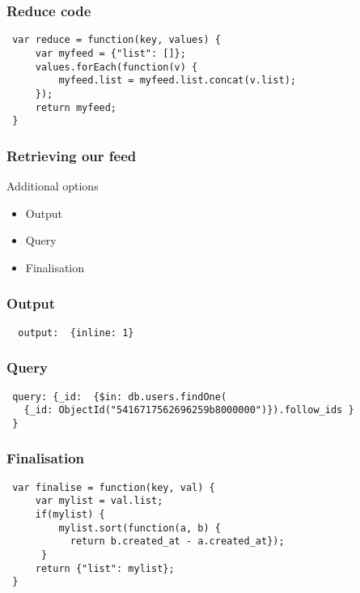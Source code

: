 \documentclass[10pt]{beamer}
\begin{document}
\begin{frame}[fragile]
  \frametitle{Reduce code}

 \begin{verbatim}
 var reduce = function(key, values) {
     var myfeed = {"list": []};
     values.forEach(function(v) {
         myfeed.list = myfeed.list.concat(v.list);
     });
     return myfeed;
 }
	     \end{verbatim}

\end{frame}


\begin{frame}
  \frametitle{Retrieving our feed}

  Additional options
 \begin{itemize}
  \item Output
  \item Query
  \item Finalisation
 \end{itemize}


\end{frame}
\begin{frame}[fragile]

  \frametitle{Output}

 \begin{verbatim}
  output:  {inline: 1}
 \end{verbatim}

\end{frame}


\begin{frame}[fragile]
  \frametitle{Query}

 \begin{verbatim}
 query: {_id:  {$in: db.users.findOne(
   {_id: ObjectId("5416717562696259b8000000")}).follow_ids }
 }
 \end{verbatim}

\end{frame}


\begin{frame}[fragile]
  \frametitle{Finalisation}

 \begin{verbatim}
 var finalise = function(key, val) {
     var mylist = val.list;
     if(mylist) {
         mylist.sort(function(a, b) { 
           return b.created_at - a.created_at});
      }
     return {"list": mylist};
 }

 \end{verbatim}

\end{frame}
\end{document}
